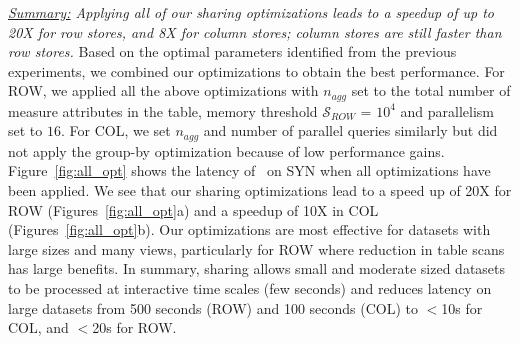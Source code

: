 {\em \underline{Summary:} Applying all of our sharing optimizations
leads to a speedup of up to 20X for row stores, and 8X for column stores;
column stores are still faster than row stores.}
Based on the optimal parameters identified from the previous experiments, we combined 
our optimizations to obtain the best performance. 
For ROW, we applied all the above optimizations with $n_{agg}$ set to
the total number of measure attributes in the table, memory threshold $\mathcal{S}_{ROW}$ 
= $10^4$ and parallelism set to $16$.
For COL, we set $n_{agg}$ and number of parallel queries similarly
but did not apply the group-by optimization because of low performance gains. 
Figure~\ref{fig:all_opt} shows the latency of \SeeDB\ on SYN when all
optimizations have been applied.
We see that our sharing optimizations lead to a speed up of 20X for ROW 
(Figures~\ref{fig:all_opt}a) and a speedup of 10X in COL (Figures~\ref{fig:all_opt}b). 
Our optimizations are most effective for datasets with 
large sizes and many views, particularly for ROW where reduction in table scans has 
large benefits.
In summary, sharing allows small and moderate sized datasets to be processed at
interactive time scales (few seconds) and reduces latency on large datasets from 
500 seconds (ROW) and 100 seconds (COL) to $<$10s for COL, and $<$20s for ROW.


